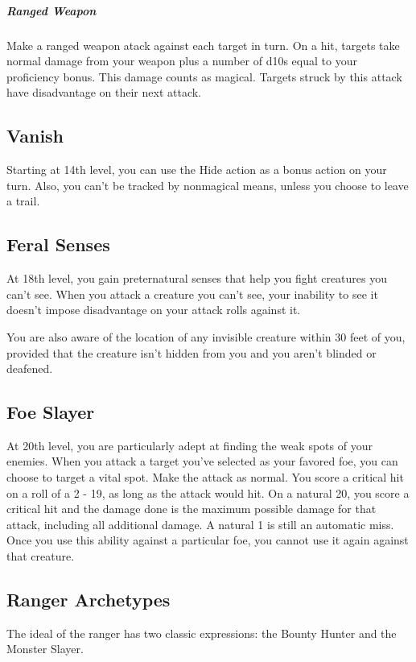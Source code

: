 \subparagraph*{Ranged Weapon} Make a ranged weapon atack against each target in turn. On a hit, targets take normal damage from your weapon plus a number of d10s equal to your proficiency bonus. This damage counts as magical. Targets struck by this attack have disadvantage on their next attack.

\subsection{Vanish}

Starting at 14th level, you can use the Hide action as a bonus action on your turn. Also, you can't be tracked by nonmagical means, unless you choose to leave a trail.

\subsection{Feral Senses}

At 18th level, you gain preternatural senses that help you fight creatures you can't see. When you attack a creature you can't see, your inability to see it doesn't impose disadvantage on your attack rolls against it.

You are also aware of the location of any invisible creature within 30 feet of you, provided that the creature isn't hidden from you and you aren't blinded or deafened.

\subsection{Foe Slayer}
At 20th level, you are particularly adept at finding the weak spots of your enemies. When you attack a target you've selected as your favored foe, you can choose to target a vital spot. Make the attack as normal. You score a critical hit on a roll of a 2 - 19, as long as the attack would hit. On a natural 20, you score a critical hit and the damage done is the maximum possible damage for that attack, including all additional damage. A natural 1 is still an automatic miss. Once you use this ability against a particular foe, you cannot use it again against that creature.

\subsection{Ranger Archetypes}

The ideal of the ranger has two classic expressions: the Bounty Hunter and the Monster Slayer.

